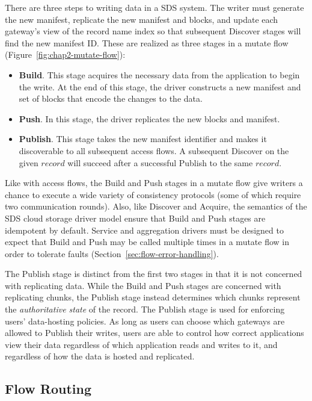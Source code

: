There are three steps to writing data in a SDS system.  The writer must
generate the new manifest, replicate the new manifest and blocks, and update
each gateway's view of the record name index so that subsequent Discover stages
will find the new manifest ID.  These are realized as three stages 
in a mutate flow (Figure~\ref{fig:chap2-mutate-flow}):

\begin{itemize}
    \item \textbf{Build}.  This stage acquires the necessary data from the
application to begin the write.  At the end of this stage, the driver constructs
a new manifest and set of blocks that encode the changes to the data. 
    \item \textbf{Push}.  In this stage, the driver replicates the new blocks and
manifest.
    \item \textbf{Publish}.  This stage takes the new manifest identifier and makes
it discoverable to all subsequent access flows.  A subsequent Discover on the
given $record$ will succeed after a successful Publish to the same $record$.
\end{itemize}

Like with access flows, the Build and Push stages in a mutate flow give writers a
chance to execute a wide variety of consistency protocols (some of which require
two communication rounds).  Also, like Discover and Acquire, the semantics of the SDS cloud storage driver model
ensure that Build and Push stages are idempotent by default.  Service and
aggregation drivers must be designed to expect that Build and Push may be called
multiple times in a mutate flow in order to tolerate faults
(Section~\ref{sec:flow-error-handling}).

The Publish stage is distinct from the first two stages in that it is
not concerned with replicating data.
While the Build and Push stages are concerned with replicating chunks, the Publish stage
instead determines which chunks represent the \emph{authoritative state} of the record.
The Publish stage is used for enforcing users' data-hosting
policies.  As long as users can choose which gateways are allowed to Publish their writes, users 
are able to control how correct applications view their data regardless of which
application reads and writes to it, and regardless of how the data is hosted and replicated.

\subsection{Flow Routing}

